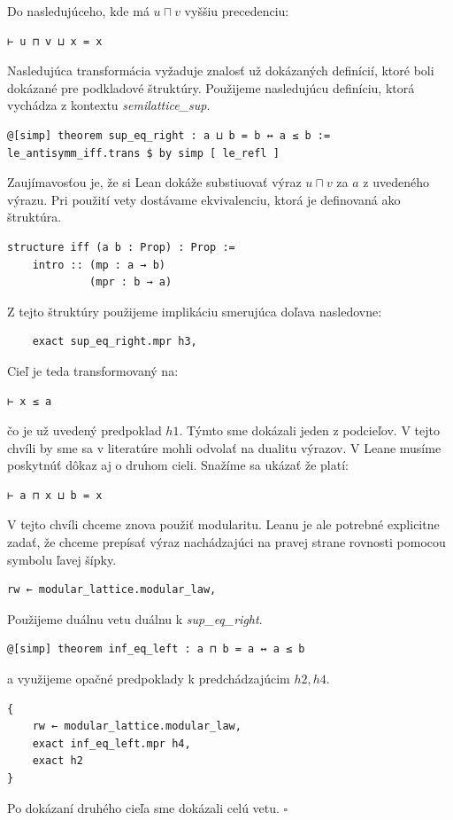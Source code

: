 \documentclass[a4paper,10pt,oneside]{report}%
\begin{document}
Do nasledujúceho, kde má $u \sqcap v$ vyššiu precedenciu:
\begin{lstlisting}
⊢ u ⊓ v ⊔ x = x
\end{lstlisting}
    Nasledujúca transformácia vyžaduje znalosť už dokázaných definícií, ktoré
boli dokázané pre podkladové štruktúry. Použijeme nasledujúcu definíciu, ktorá vychádza
z kontextu \emph{semilattice\_sup}.
\begin{lstlisting}
@[simp] theorem sup_eq_right : a ⊔ b = b ↔ a ≤ b :=
le_antisymm_iff.trans $ by simp [ le_refl ]
\end{lstlisting}
    Zaujímavosťou je, že si Lean dokáže substiuovať výraz $u \sqcap v$ za $a$ z uvedeného
výrazu. Pri použití vety dostávame ekvivalenciu, ktorá je definovaná ako štruktúra.
\begin{lstlisting}
structure iff (a b : Prop) : Prop :=
    intro :: (mp : a → b)
             (mpr : b → a)
\end{lstlisting}
Z tejto štruktúry použijeme implikáciu smerujúca doľava nasledovne:
\begin{lstlisting}
    exact sup_eq_right.mpr h3,
\end{lstlisting}
    Cieľ je teda transformovaný na:
\begin{lstlisting}
⊢ x ≤ a
\end{lstlisting}
čo je už uvedený predpoklad $h1$. Týmto sme dokázali jeden z podcieľov.
    V tejto chvíli by sme sa v literatúre mohli odvolať na dualitu výrazov.
    V Leane musíme poskytnúť dôkaz aj o druhom cieli. Snažíme sa ukázať že platí:
\begin{lstlisting}
⊢ a ⊓ x ⊔ b = x
\end{lstlisting}
V tejto chvíli chceme znova použiť modularitu. Leanu je ale potrebné explicitne zadať,
    že chceme prepísať výraz nachádzajúci na pravej strane rovnosti pomocou symbolu
ľavej šípky.
\begin{lstlisting}
rw ← modular_lattice.modular_law,
\end{lstlisting}
    Použijeme duálnu vetu
    duálnu k \emph{sup\_eq\_right}.
\begin{lstlisting}
@[simp] theorem inf_eq_left : a ⊓ b = a ↔ a ≤ b
\end{lstlisting}
    a využijeme opačné predpoklady k predchádzajúcim $h2, h4$.
\begin{lstlisting}
{
    rw ← modular_lattice.modular_law,
    exact inf_eq_left.mpr h4,
    exact h2
}
\end{lstlisting}

    Po dokázaní druhého cieľa sme dokázali celú vetu. $\square$
\end{document}
